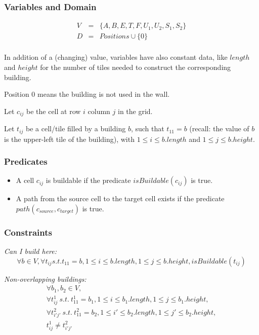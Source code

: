 \documentclass[a4paper,11pt]{article}
\begin{document}
\subsubsection{Variables and Domain}

\begin{displaymath}
  \begin{array}{ccc}
    V & = & \{A, B, E, T, F, U_1, U_2, S_1, S_2\}\\
    D & = & Positions \cup \{0\}\\
  \end{array}
\end{displaymath}

In addition of a (changing)  value, variables have also constant data,
like $length$ and $height$ for the number of tiles needed to construct
the corresponding building.

Position $0$  means the building is  not used in  the wall.

Let $c_{ij}$ be the cell at row $i$ column $j$ in the grid.

Let  $t_{ij}$ be  a  cell/tile filled  by  a building  $b$, such  that
$t_{11} = b$  (recall: the value of $b$ is the  upper-left tile of the
building), with $1 \leq i \leq b.length$ and $1 \leq j \leq b.height$.


\subsubsection{Predicates}

\begin{itemize}
\item A cell $c_{ij}$ is buildable if the predicate {\bf $isBuildable(c_{ij})$} is
  true.
\item A  path from the  source cell to  the target cell exists  if the
  predicate {\bf $path(c_{source}, c_{target})$} is true.
\end{itemize}

\subsubsection{Constraints}

{\em Can I build here:}
\begin{displaymath}
  \forall  b \in V,  \forall t_{ij}  s.t. t_{11}  = b,  1 \leq  i \leq
  b.length, 1 \leq j \leq b.height, isBuildable(t_{ij})
\end{displaymath}

\noindent
{\em Non-overlapping buildings:}
\begin{displaymath}
  \begin{array}{l}
    \forall b_1, b_2 \in V,\\
    \forall t^1_{ij}\  s.t.\ t^1_{11} = b_1,  1 \leq i  \leq b_1.length, 1
    \leq j \leq b_1.height,\\
    \forall t^2_{i'j'}\ s.t.\ t^2_{11} = b_2, 1 \leq i' \leq b_2.length, 1
    \leq j' \leq b_2.height,\\
    t^1_{ij} \neq t^2_{i'j'}
  \end{array}
\end{displaymath}
\end{document}
